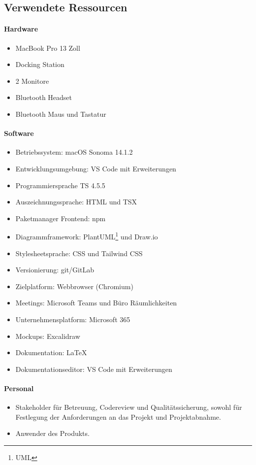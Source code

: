 \subsection{Verwendete Ressourcen}
\label{app:VerwendeteRessourcen}

\paragraph{Hardware}
\begin{itemize}
	\item MacBook Pro 13 Zoll
	\item Docking Station
	\item 2 Monitore
	\item Bluetooth Headset
	\item Bluetooth Maus und Tastatur
\end{itemize}

\paragraph{Software}
\begin{itemize}
	\item Betriebssystem: macOS Sonoma 14.1.2
	\item Entwicklungsumgebung: \ac{VS} Code mit Erweiterungen
	\item Programmiersprache \ac{TS} 4.5.5
	\item Auszeichnungssprache: \ac{HTML} und \ac{TSX}
	\item Paketmanager Frontend: npm
	\item Diagrammframework: PlantUML\footnote{\ac{UML}} und Draw.io
	\item Stylesheetsprache: \ac{CSS} und Tailwind \ac{CSS}
	\item Versionierung: git/GitLab
	\item Zielplatform: Webbrowser (Chromium)
	\item Meetings: Microsoft Teams und Büro Räumlichkeiten
	\item Unternehmensplatform: Microsoft 365
	\item Mockups: Excalidraw
	\item Dokumentation: LaTeX
	\item Dokumentationseditor: \ac{VS} Code mit Erweiterungen
\end{itemize}

\paragraph{Personal}
\begin{itemize}
	\item Stakeholder für Betreuung, Codereview und Qualitätssicherung, sowohl für Festlegung der Anforderungen an das Projekt und Projektabnahme.
	\item Anwender des Produkts.
\end{itemize}